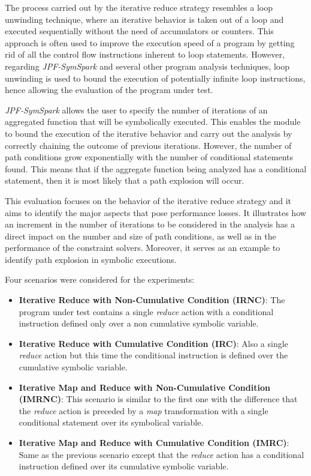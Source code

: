 
The process carried out by the iterative reduce strategy resembles a loop unwinding technique, where an iterative behavior is taken out of a loop and executed sequentially without the need of accumulators or counters. This approach is often used to improve the execution speed of a program by getting rid of all the control flow instructions inherent to loop statements. However, regarding \textit{JPF-SymSpark} and several other program analysis techniques, loop unwinding is used to bound the execution of potentially infinite loop instructions, hence allowing the evaluation of the program under test.

\textit{JPF-SymSpark} allows the user to specify the number of iterations of an aggregated function that will be symbolically executed. This enables the module to bound the execution of the iterative behavior and carry out the analysis by correctly chaining the outcome of previous iterations. However, the number of path conditions grow exponentially with the number of conditional statements found. This means that if the aggregate function being analyzed has a conditional statement, then it is most likely that a path explosion will occur.

This evaluation focuses on the behavior of the iterative reduce strategy and it aims to identify the major aspects that pose performance losses. It illustrates how an increment in the number of iterations to be considered in the analysis has a direct impact on the number and size of path conditions, as well as in the performance of the constraint solvers. Moreover, it serves as an example to identify path explosion in symbolic executions.


Four scenarios were considered for the experiments:

\begin{itemize}
	\item \textbf{Iterative Reduce with Non-Cumulative Condition (IRNC)}: The program under test contains a single \textit{reduce} action with a conditional instruction defined only over a non cumulative symbolic variable.
	\item \textbf{Iterative Reduce with Cumulative Condition (IRC)}: Also a single \textit{reduce} action but this time the conditional instruction is defined over the cumulative symbolic variable.
	\item \textbf{Iterative Map and Reduce with Non-Cumulative Condition (IMRNC)}: This scenario is similar to the first one with the difference that the \textit{reduce} action is preceded by a \textit{map} transformation with a single conditional statement over its symbolical variable.
	\item \textbf{Iterative Map and Reduce with Cumulative Condition (IMRC)}: Same as the previous scenario except that the \textit{reduce} action has a conditional instruction defined over its cumulative symbolic variable.
\end{itemize}

